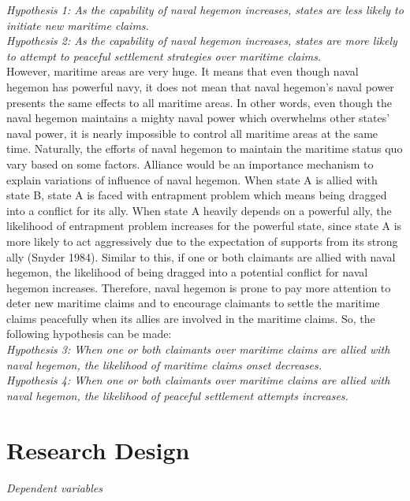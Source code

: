 \documentclass{article}
\begin{document}
\emph{Hypothesis 1: As the capability of naval hegemon increases, states are less likely to initiate new maritime claims.}
\\

\emph{Hypothesis 2: As the capability of naval hegemon increases, states are more likely to attempt to peaceful settlement strategies over maritime claims.}
\\

However, maritime areas are very huge. It means that even though naval hegemon has powerful navy, it does not mean that naval hegemon’s naval power presents the same effects to all maritime areas. In other words, even though the naval hegemon maintains a mighty naval power which overwhelms other states’ naval power, it is nearly impossible to control all maritime areas at the same time. Naturally, the efforts of naval hegemon to maintain the maritime status quo vary based on some factors. Alliance would be an importance mechanism to explain variations of influence of naval hegemon. When state A is allied with state B, state A is faced with entrapment problem which means being dragged into a conflict for its ally. When state A heavily depends on a powerful ally, the likelihood of entrapment problem increases for the powerful state, since state A is more likely to act aggressively due to the expectation of supports from its strong ally (Snyder 1984). Similar to this, if one or both claimants are allied with naval hegemon, the likelihood of being dragged into a potential conflict for naval hegemon increases. Therefore, naval hegemon is prone to pay more attention to deter new maritime claims and to encourage claimants to settle the maritime claims peacefully when its allies are involved in the maritime claims. So, the following hypothesis can be made:
\\

\emph{Hypothesis 3: When one or both claimants over maritime claims are allied with naval hegemon, the likelihood of maritime claims onset decreases.}
\\

\emph{Hypothesis 4: When one or both claimants over maritime claims are allied with naval hegemon, the likelihood of peaceful settlement attempts increases.}
\\

\section*{Research Design}
\emph{Dependent variables}
\end{document}
